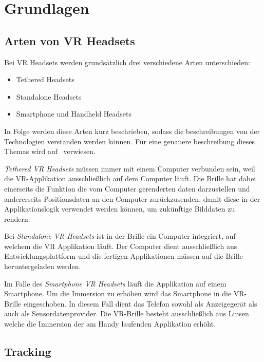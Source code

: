 \section{Grundlagen}
\label{sec:basics}

\subsection{Arten von VR Headsets}
\label{sec:vr-headset-types}

Bei VR Headsets werden grundsätzlich drei verschiedene Arten unterschieden:

\begin{itemize}
    \item Tethered Headsets
    \item Standalone Headsets
    \item Smartphone und Handheld Headsets
\end{itemize}

In Folge werden diese Arten kurz beschrieben, sodass die beschreibungen von der Technologien verstanden werden können.
Für eine genauere beschreibung dieses Themas wird auf~\cite{ANIWAA_TEAM_2021} verwiesen.

\emph{Tethered VR Headsets} müssen immer mit einem Computer verbunden sein, weil die VR-Applikation ausschließlich auf dem Computer läuft.
Die Brille hat dabei einerseits die Funktion die vom Computer gerenderten daten darzustellen und andererseits Positionsdaten an den Computer zurückzusenden, damit diese in der Applikationslogik verwendet werden können, um zukünftige Bilddaten zu rendern.

Bei \emph{Standalone VR Headsets} ist in der Brille ein Computer integriert, auf welchem die VR Applikation läuft.
Der Computer dient ausschließlich aus Entwicklungsplattform und die fertigen Applikationen müssen auf die Brille heruntergeladen werden.

Im Falle des \emph{Smartphone VR Headsets} läuft die Applikation auf einem Smartphone.
Um die Immersion zu erhöhen wird das Smartphone in die VR-Brille eingeschoben.
In diesem Fall dient das Telefon sowohl als Anzeigegerät als auch als Sensordatenprovider.
Die VR-Brille besteht ausschließlich aus Linsen welche die Immersion der am Handy laufenden Applikation erhöht.

\subsection{Tracking}
\label{sec:tracking}

